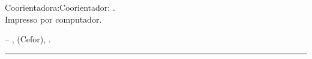 \documentclass[
	12pt,				%
        openright, %
        twoside,   %
	a4paper,			%
	chapter=TITLE,		%
	english,			%
	french,				%
	spanish,			%
	brazil,				%
    ]{abntex2}
\providecommand{\imprimirsubinstituicao}{}
\providecommand{\imprimirpalavraschave}{}
\providecommand{\imprimirCDU}{}
\providecommand{\imprimirbibliotecario}{}
\begin{document}
\begin{fichacatalografica}
\begin{center}
{\begin{minipage}[c][9cm]{13cm}
\begin{minipage}[c][9cm] {12.5cm}
\begin{flushleft}
\ifx\generocoorientador\undefined
\else
{
{
{\hspace{0.5cm}Coorientadora:}{\hspace{0.5cm}Coorientador:}
\imprimircoorientador.\\}
{}
}
\fi
         \hspace{0.5cm}Impresso por computador.
        
         \hspace{0.5cm}\imprimirtipotrabalho{ }--{ }\imprimirinstituicao, \imprimirsubinstituicao { }(Cefor), \imprimirdata.
         \vspace{0.5cm}

		    \hspace{0.5cm}
{ 
\imprimirpalavraschave
}
	   \end{flushleft}

	    \begin{flushright}
{
\vspace{-2mm}
\imprimirCDU
}
        \end{flushright}
        \hrule

        \vspace*{\fill}
        \begin{flushleft}
        \small
{ 
\vspace{-1mm}
\imprimirbibliotecario
}
        \end{flushleft}
        \vspace*{\fill}
        
        \end{minipage}
       \end{minipage}
}
	\end{center}

\end{fichacatalografica}
\end{document}
